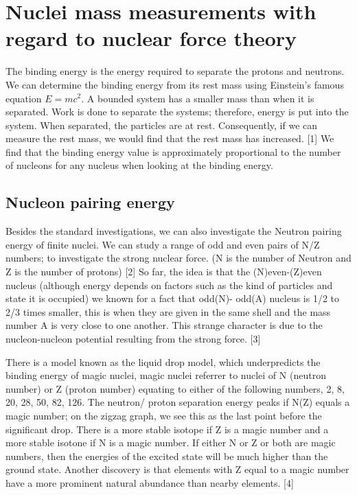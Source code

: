 \section{Nuclei mass measurements with regard to nuclear force theory}
The binding energy is the energy required to separate the protons and neutrons.
We can determine the binding energy from its rest mass using Einstein’s famous equation $E=mc^2$.
A bounded system has a smaller mass than when it is separated.
Work is done to separate the systems; therefore, energy is put into the system.
When separated, the particles are at rest.
Consequently, if we can measure the rest mass, we would find that the rest mass has increased. [1]
We find that the binding energy value is approximately proportional to the number of nucleons for any nucleus when looking at the binding energy.

\subsection{Nucleon pairing energy}
Besides the standard investigations, we can also investigate the Neutron pairing energy of finite nuclei.
We can study a range of odd and even pairs of N/Z numbers; to investigate the strong nuclear force.
(N is the number of Neutron and Z is the number of protons) [2] So far, the idea is that the (N)even-(Z)even nucleus (although energy depends on factors such as the kind of particles and state it is occupied) we known for a fact that odd(N)- odd(A) nucleus is 1/2 to 2/3 times smaller, this is when they are given in the same shell and the mass number A is very close to one another.
This strange character is due to the nucleon-nucleon potential resulting from the strong force. [3]

There is a model known as the liquid drop model, which underpredicts the binding energy of magic nuclei, magic nuclei referrer to nuclei of N (neutron number) or Z (proton number) equating to either of the following numbers, 2, 8, 20, 28, 50, 82, 126.
The neutron/ proton separation energy peaks if N(Z) equals a magic number; on the zigzag graph, we see this as the last point before the significant drop.
There is a more stable isotope if Z is a magic number and a more stable isotone if N is a magic number.
If either N or Z or both are magic numbers, then the energies of the excited state will be much higher than the ground state.
Another discovery is that elements with Z equal to a magic number have a more prominent natural abundance than nearby elements. [4]

